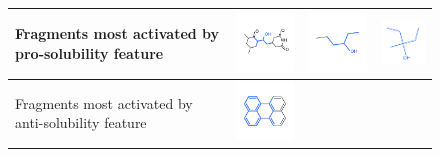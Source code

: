 \documentclass{article}
\begin{document}
\newcommand{\molfeature}[3]{\texttt{[image: fig\_4.pdf]}\vspace{-1em}}%
\begin{figure}[h]%
\vspace{-1em}
\begin{tabular}{>{\centering}m{1.1in} >{\centering}m{3.1cm} >{\centering}m{3.1cm} >{\centering\arraybackslash}m{3.1cm}}
Fragments most activated by pro-solubility feature & 
\includegraphics[width=3.3cm, clip, trim = 2mm 3mm 2mm 6mm]{fig_5.pdf}\vspace{-1em} &
\includegraphics[width=3.3cm, clip, trim = 2mm 3mm 2mm 6mm]{fig_6.pdf}\vspace{-1em} &
\includegraphics[width=2.5cm, clip, trim = 2mm 3mm 2mm 6mm]{fig_7.pdf}\vspace{-1em} \\
\midrule
Fragments most activated by anti-solubility feature & 
\includegraphics[width=3.3cm, clip, trim = 2mm 3mm 2mm 6mm]{fig_8.pdf}\vspace{-1em} &

\end{tabular}
\end{figure}
\end{document}
